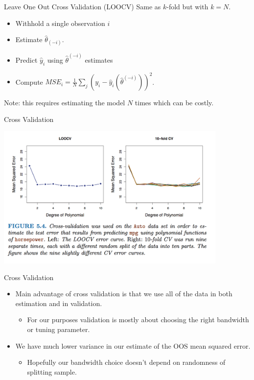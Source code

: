 \documentclass[aspectratio=169]{beamer}
\begin{document}
\begin{frame}{Leave One Out Cross Validation (LOOCV)}
Same as $k$-fold but with $k=N$.
\begin{itemize}
\item Withhold a single observation $i$
\item Estimate $\hat{\theta}_{(-i)}$.
\item Predict $\hat{y}_i$ using $\hat{\theta}^{(-i)}$ estimates
\item Compute $MSE_i =\frac{1}{N} \sum_j (y_i -\hat{y}_i(\hat{\theta}^{(-i)}))^2$.
\end{itemize}
\vspace{0.2cm}
Note: this requires estimating the model $N$ times which can be costly.
\end{frame}



\begin{frame}{Cross Validation}
\begin{center}
\includegraphics[width=4.5in]{./resources/comparison-cv}
\end{center}
\end{frame}

\begin{frame}{Cross Validation}
\begin{itemize}
\item Main advantage of cross validation is that we use all of the data in both \alert{estimation} and in \alert{validation}.
\begin{itemize}
\item For our purposes validation is mostly about choosing the right bandwidth or tuning parameter.
\end{itemize}
\item We have much lower variance in our estimate of the OOS mean squared error.
\begin{itemize}
\item Hopefully our bandwidth choice doesn't depend on randomness of splitting sample.
\end{itemize}
\end{itemize}
\end{frame}
\end{document}
